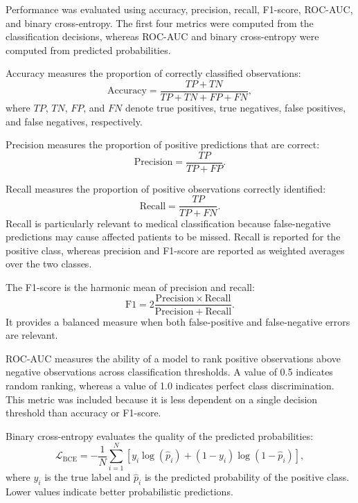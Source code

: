 \documentclass[11pt,a4paper,oneside, openany, reqno, chapter, nokorean]{oblivoir}
\theoremstyle{definition}
\theoremstyle{remark}
\numberwithin{equation}{chapter}
\theoremstyle{definition}
\theoremstyle{remark}
\theoremstyle{definition}
\begin{document}
Performance was evaluated using accuracy, precision, recall, F1-score, ROC-AUC, and binary cross-entropy. The first four metrics were computed from the classification decisions, whereas ROC-AUC and binary cross-entropy were computed from predicted probabilities.

Accuracy measures the proportion of correctly classified observations:
\begin{equation}
\mathrm{Accuracy}=
\frac{TP+TN}{TP+TN+FP+FN},
\label{eq:accuracy}
\end{equation}
where $TP$, $TN$, $FP$, and $FN$ denote true positives, true negatives, false positives, and false negatives, respectively.

Precision measures the proportion of positive predictions that are correct:
\begin{equation}
\mathrm{Precision}=\frac{TP}{TP+FP}.
\label{eq:precision}
\end{equation}

Recall measures the proportion of positive observations correctly identified:
\begin{equation}
\mathrm{Recall}=\frac{TP}{TP+FN}.
\label{eq:recall}
\end{equation}
Recall is particularly relevant to medical classification because false-negative predictions may cause affected patients to be missed. Recall is reported for the positive class, whereas precision and F1-score are reported as weighted averages over the two classes.


The F1-score is the harmonic mean of precision and recall:
\begin{equation}
\mathrm{F1}=2\frac{\mathrm{Precision}\times\mathrm{Recall}}
{\mathrm{Precision}+\mathrm{Recall}}.
\label{eq:f1}
\end{equation}
It provides a balanced measure when both false-positive and false-negative errors are relevant.



ROC-AUC measures the ability of a model to rank positive observations above negative observations across classification thresholds. A value of 0.5 indicates random ranking, whereas a value of 1.0 indicates perfect class discrimination. This metric was included because it is less dependent on a single decision threshold than accuracy or F1-score.


Binary cross-entropy evaluates the quality of the predicted probabilities:
\begin{equation}
\mathcal{L}_{\mathrm{BCE}}=-\frac{1}{N}\sum_{i=1}^{N}
\left[y_i\log(\hat{p}_i)+(1-y_i)\log(1-\hat{p}_i)\right],
\label{eq:bce}
\end{equation}
where $y_i$ is the true label and $\hat{p}_i$ is the predicted probability of the positive class. Lower values indicate better probabilistic predictions.
\end{document}
